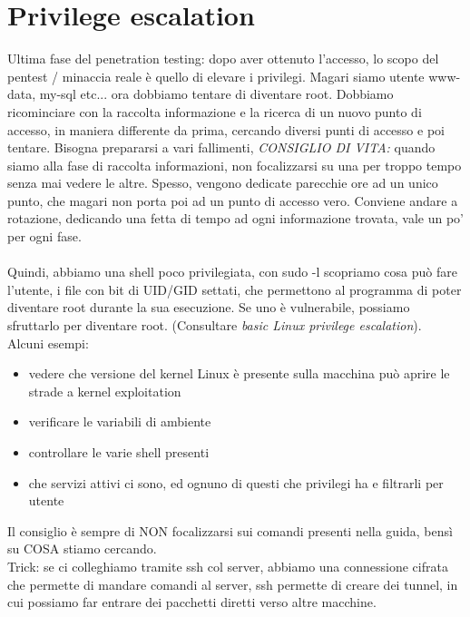 \documentclass{article}
\begin{document}
\section{Privilege escalation}
Ultima fase del penetration testing: dopo aver ottenuto l'accesso, lo scopo del pentest / minaccia reale è quello di elevare i privilegi. Magari siamo utente www-data, my-sql etc... ora dobbiamo tentare di diventare root. Dobbiamo ricominciare con la raccolta informazione e la ricerca di un nuovo punto di accesso, in maniera differente da prima, cercando diversi punti di accesso e poi tentare. Bisogna prepararsi a vari fallimenti, \textit{CONSIGLIO DI VITA: }quando siamo alla fase di raccolta informazioni, non focalizzarsi su una per troppo tempo senza mai vedere le altre. Spesso, vengono dedicate parecchie ore ad un unico punto, che magari non porta poi ad un punto di accesso vero. Conviene andare a rotazione, dedicando una fetta di tempo ad ogni informazione trovata, vale un po' per ogni fase.\\\\ Quindi, abbiamo una shell poco privilegiata, con sudo -l scopriamo cosa può fare l'utente, i file con bit di UID/GID settati, che permettono al programma di poter diventare root durante la sua esecuzione. Se uno è vulnerabile, possiamo sfruttarlo per diventare root. (Consultare \textit{basic Linux privilege escalation}).\\ Alcuni esempi:
\begin{itemize}
\item vedere che versione del kernel Linux è presente sulla macchina può aprire le strade a kernel exploitation
\item verificare le variabili di ambiente
\item controllare le varie shell presenti
\item che servizi attivi ci sono, ed ognuno di questi che privilegi ha e filtrarli per utente
\end{itemize}
Il consiglio è sempre di NON focalizzarsi sui comandi presenti nella guida, bensì su COSA stiamo cercando.\\ Trick: se ci colleghiamo tramite ssh col server, abbiamo una connessione cifrata che permette di mandare comandi al server, ssh permette di creare dei tunnel, in cui possiamo far entrare dei pacchetti diretti verso altre macchine.
\end{document}
